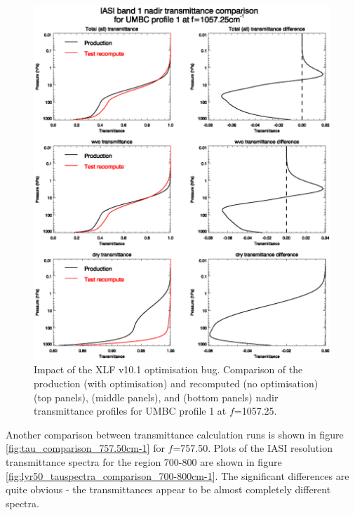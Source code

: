 \begin{figure}[htp]
  \centering
  \includegraphics[scale=0.8]{graphics/tau_comparison_1057.25cm-1.eps}
  \caption{Impact of the XLF v10.1 optimisation bug. Comparison of the production (with optimisation) and recomputed (no optimisation)  (top panels),  (middle panels), and  (bottom panels) nadir transmittance profiles for UMBC profile 1 at $f$=1057.25\invcm{}.}
  \label{fig:tau_comparison_1057.25cm-1}
\end{figure}
Another comparison between transmittance calculation runs is shown in figure \ref{fig:tau_comparison_757.50cm-1} for $f$=757.50\invcm{}. Plots of the IASI resolution transmittance spectra for the region 700-800\invcm{} are shown in figure \ref{fig:lyr50_tauspectra_comparison_700-800cm-1}. The significant differences are quite obvious - the  transmittances appear to be almost completely different spectra.
